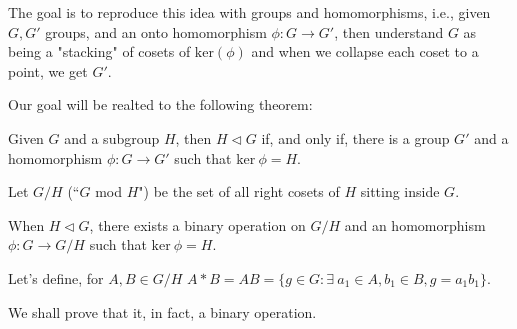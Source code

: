 The goal is to reproduce this idea with groups and homomorphisms, i.e., given $G, G'$ groups, and an onto homomorphism  $\phi: G \to G'$, then understand $G$ as being a "stacking" of cosets of $\mathrm{ker}(\phi)$ and when we collapse each coset to a point, we get $G'$.

Our goal will be realted to the following theorem:

\begin{thm}
	Given $G$ and a subgroup $H$, then $H \vartriangleleft G$ if, and only if, there is a group $G'$ and a homomorphism  $\phi: G \to G'$ such that  $\mathrm{ker}\ \phi = H$. 
\end{thm}

\begin{defn}[Notation]
	Let $G/H$ (``$G$ mod  $H$") be the set of all right cosets of $H$ sitting inside $G$.
\end{defn}

\begin{thm}
	When $H \vartriangleleft G$, there exists a binary operation on $G/H$ and an homomorphism $\phi: G \to G/H$ such that $\mathrm{ker}\ \phi = H$.
\end{thm}

\begin{dem}
	Let's define, for $A, B \in G/H$ $A*B = AB = \{g \in G : \exists\ a_1 \in A, b_1 \in B, g = a_1b_1\}$.
	
	We shall prove that it, in fact, a binary operation.
\end{dem}
